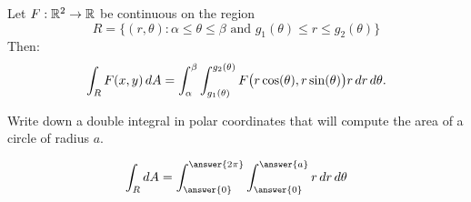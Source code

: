 \documentclass{ximera}
\begin{document}
\begin{theorem}
  Let $F:\mathbb R^2\to\mathbb R$ be continuous on the region
  \[
  R=\{(r,\theta):\text{$\alpha\leq\theta\leq\beta$ and $g_1(\theta)\leq r\leq g_2(\theta)$}\}
  \]
  Then: 
  \[
  \int_R F(x,y)\mathop{}\!d A = \int_\alpha^\beta\int_{g_1(\theta)}^{g_2(\theta)} F\big(r\cos(\theta),r\sin(\theta)\big) r\mathop{}\!d r\mathop{}\!d \theta.
  \]
\end{theorem}

\begin{question}
  Write down a double integral in polar coordinates that will compute
  the area of a circle of radius $a$.
  \begin{prompt}
  \[
  \int_R \d A = \int_{\answer{0}}^{\answer{2\pi}}
  \int_{\answer{0}}^{\answer{a}}r \d r \d \theta 
  \]
  \end{prompt}
\end{question}
\end{document}
